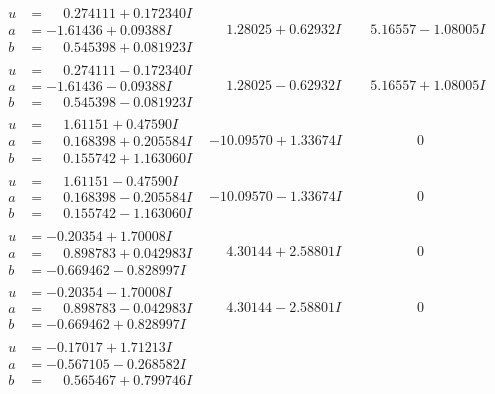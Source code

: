 \documentclass[1p]{elsarticle_modified}
\theoremstyle{definition}
\begin{document}
$$\begin{array}{c|c|c}
\begin{aligned}
u &= \phantom{-}0.274111 + 0.172340 I \\
a &= -1.61436 + 0.09388 I \\
b &= \phantom{-}0.545398 + 0.081923 I\end{aligned}
 & \phantom{-}1.28025 + 0.62932 I & \phantom{-}5.16557 - 1.08005 I \\ \hline\begin{aligned}
u &= \phantom{-}0.274111 - 0.172340 I \\
a &= -1.61436 - 0.09388 I \\
b &= \phantom{-}0.545398 - 0.081923 I\end{aligned}
 & \phantom{-}1.28025 - 0.62932 I & \phantom{-}5.16557 + 1.08005 I \\ \hline\begin{aligned}
u &= \phantom{-}1.61151 + 0.47590 I \\
a &= \phantom{-}0.168398 + 0.205584 I \\
b &= \phantom{-}0.155742 + 1.163060 I\end{aligned}
 & -10.09570 + 1.33674 I & \phantom{-0.000000 } 0 \\ \hline\begin{aligned}
u &= \phantom{-}1.61151 - 0.47590 I \\
a &= \phantom{-}0.168398 - 0.205584 I \\
b &= \phantom{-}0.155742 - 1.163060 I\end{aligned}
 & -10.09570 - 1.33674 I & \phantom{-0.000000 } 0 \\ \hline\begin{aligned}
u &= -0.20354 + 1.70008 I \\
a &= \phantom{-}0.898783 + 0.042983 I \\
b &= -0.669462 - 0.828997 I\end{aligned}
 & \phantom{-}4.30144 + 2.58801 I & \phantom{-0.000000 } 0 \\ \hline\begin{aligned}
u &= -0.20354 - 1.70008 I \\
a &= \phantom{-}0.898783 - 0.042983 I \\
b &= -0.669462 + 0.828997 I\end{aligned}
 & \phantom{-}4.30144 - 2.58801 I & \phantom{-0.000000 } 0 \\ \hline\begin{aligned}
u &= -0.17017 + 1.71213 I \\
a &= -0.567105 - 0.268582 I \\
b &= \phantom{-}0.565467 + 0.799746 I\end{aligned}

\end{array}$$
\end{document}

